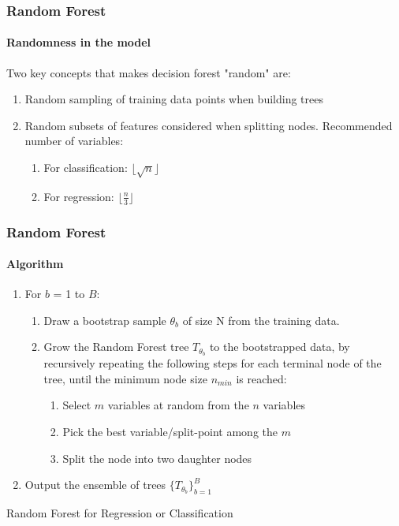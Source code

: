 \begin{frame}
\frametitle{Random Forest}
\framesubtitle{Randomness in the model}

Two key concepts that makes decision forest "random" are:
\vspace{1ex}
\begin{enumerate}
	\item Random sampling of training data points when building trees
\vspace{1ex}
	\item Random subsets of features considered when splitting nodes. Recommended number of variables:
\vspace{1ex}
	\begin{enumerate}[a]
	    \item For classification:  $\lfloor{\sqrt{n}} \rfloor$
\vspace{1ex}
	    \item For regression: $\lfloor \frac{n}{3} \rfloor$
	\end{enumerate}
\end{enumerate}


\end{frame}

\begin{frame}
\frametitle{Random Forest}
\framesubtitle{Algorithm}

\begin{algorithm}[H]
\SetAlgoLined
\begin{enumerate}
	\bigbreak
	\item For $b$ = 1 to $B$:
	\begin{enumerate}[a]
	    \item Draw a bootstrap sample $\theta_{b}$ of size N from the training data.
	    \item Grow the Random Forest tree ${{T}_{\theta_{b}}}$ to the bootstrapped data, by recursively repeating the following steps for each terminal node of the tree, until the minimum node size $n_{min}$ is reached:
	    \begin{enumerate}[i]
	       \item Select $m$ variables at random from the $n$ variables
	       \item Pick the best variable/split-point among the $m$
	       \item  Split the node into two daughter nodes
	    \end{enumerate}
	\end{enumerate}
	\item  Output the ensemble of trees $\{{T}_{\theta_{b}}\}_{b=1}^{B}$
	\smallbreak
\end{enumerate}
 \caption{Random Forest for Regression or Classification}
\end{algorithm}

\end{frame}
















